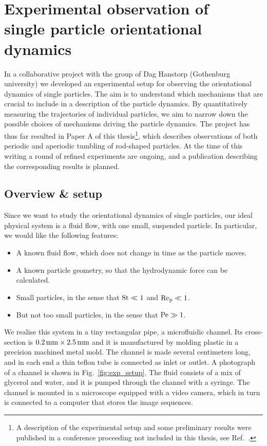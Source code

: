 \documentclass[thesis.tex]{subfiles}
\begin{document}
\chapter[Experimental observations]{Experimental observation of \\single particle orientational dynamics}\label{sec:experiment}

In a collaborative project with the group of Dag Hanstorp (Gothenburg university) we developed an experimental setup for observing the orientational dynamics of single particles. The aim is to understand which mechanisms that are crucial to include in a description of the particle dynamics. By quantitatively measuring the trajectories of individual particles, we aim to narrow down the possible choices of mechanisms driving the particle dynamics. The project has thus far resulted in Paper A of this thesis\footnote{A description of the experimental setup and some preliminary results were published in a conference proceeding not included in this thesis, see Ref.~\cite{mishra2012}.}, which describes observations of both periodic and aperiodic tumbling of rod-shaped particles. At the time of this writing a round of refined experiments are ongoing, and a publication describing the corresponding results is planned.

\section{Overview \& setup}

Since we want to study the orientational dynamics of single particles, our ideal physical system is a fluid flow, with one small, suspended particle. In particular, we would like the following features:
\begin{itemize}
	\item A known fluid flow, which does not change in time as the particle moves.
	\item A known particle geometry, so that the hydrodynamic force can be calculated.
	\item Small particles, in the sense that $\mbox{St}\ll1$ and $\mbox{Re}_{\mathrm p}\ll1$.
	\item But not too small particles, in the sense that $\mbox{Pe}\gg1$.
\end{itemize}
We realise this system in a tiny rectangular pipe, a microfluidic channel. Its cross-section is $\unit[0.2]{mm}\times\unit[2.5]{mm}$ and it is manufactured by molding plastic in a precision machined metal mold. The channel is made several centimeters long, and in each end a thin teflon tube is connected as inlet or outlet. A photograph of a channel is shown in Fig.~\ref{fig:exp_setup}. The fluid consists of a mix of glycerol and water, and it is pumped through the channel with a syringe. The channel is mounted in a microscope equipped with a video camera, which in turn is connected to a computer that stores the image sequences.
\end{document}
